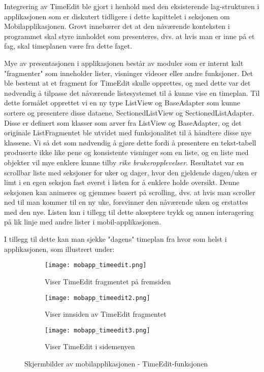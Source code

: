 \documentclass[../main.tex]{subfiles}
\begin{document}
 Integrering av TimeEdit ble gjort i henhold med den eksisterende lag-strukturen i applikasjonen som er diskutert tidligere i dette kapittelet i seksjonen om Mobilapplikasjonen. Grovt innebærer det at den nåværende konteksten i programmet skal styre innholdet som presenteres, dvs. at hvis man er inne på et fag, skal timeplanen være fra dette faget.
 
Mye av presentasjonen i applikasjonen består av moduler som er internt kalt "fragmenter" som inneholder lister, visninger videoer eller andre funksjoner. Det ble bestemt at et fragment for TimeEdit skulle opprettes, og med dette var det nødvendig å tilpasse det nåværende listesystemet til å kunne vise en timeplan.
Til dette formålet opprettet vi en ny type ListView og BaseAdapter som kunne sortere og presentere disse dataene, SectionedListView og SectionedListAdapter.
Disse er definert som klasser som arver fra ListView og BaseAdapter, og det originale ListFragmentet ble utvidet med funksjonalitet til å håndtere disse nye klassene.
Vi så det som nødvendig å gjøre dette fordi å presentere en tekst-tabell produserte ikke like pene og konsistente visninger som en liste, og en liste med objekter vil mye enklere kunne tilby \textit{rike brukeropplevelser}. Resultatet var en scrollbar liste med seksjoner for uker og dager, hvor den gjeldende dagen/uken er limt i en egen seksjon fast øverst i listen for å enklere holde oversikt. Denne seksjonen kan animeres og gjemmes basert på scrolling, dvs. at hvis man scroller ned til man kommer til en ny uke, forsvinner den nåværende uken og erstattes med den nye. 
Listen kan i tillegg til dette akseptere trykk og annen interagering på lik linje med andre lister i mobil-applikasjonen.

I tillegg til dette kan man sjekke "dagens" timeplan fra hvor som helst i applikasjonen, som illustrert under:

\begin{figure}[H]
        \centering
        \begin{subfigure}[b]{0.3\textwidth}
                \centering
                \texttt{[image: mobapp\_timeedit.png]}
                \caption{Viser TimeEdit fragmentet på fremsiden}
        \end{subfigure}
        \quad
        \begin{subfigure}[b]{0.3\textwidth}
                \centering
                \texttt{[image: mobapp\_timeedit2.png]}
                \caption{Viser innsiden av TimeEdit fragmentet}
        \end{subfigure}
        \quad
                \begin{subfigure}[b]{0.3\textwidth}
                        \centering
                        \texttt{[image: mobapp\_timeedit3.png]}
                        \caption{Viser TimeEdit i sidemenyen}
                \end{subfigure}
        \caption{Skjermbilder av mobilapplikasjonen - TimeEdit-funksjonen}
\end{figure}
\end{document}
